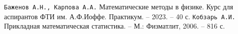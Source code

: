 \begin{thebibliography}{}
	\texttt{Баженов А.Н., Карпова А.А.} Математические методы в физике. Курс для аспирантов ФТИ им. А.Ф.Иоффе. Практикум. -- 2023. -- 40 с.
	\texttt{Кобзарь А.И.} Прикладная математическая статистика. -- М.: Физматлит, 2006. -- 816 с.
\end{thebibliography}
